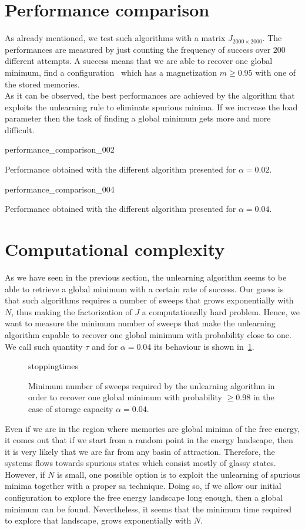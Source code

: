 \documentclass[\rootdir/main.tex]{subfiles}
\begin{document}
\section{Performance comparison}
As already mentioned, we test such algorithms with a matrix $J_{2000 \times 2000}$. The performances are measured by just counting the frequency of success over $200$ different attempts. A success means that we are able to recover one global minimum, \ie find a configuration \bsigma\ which has a magnetization $m \geq 0.95$ with one of the stored memories.\\
As it can be observed, the best performances are achieved by the algorithm that exploits the unlearning rule to eliminate spurious minima. If we increase the load parameter then the task of finding a global minimum gets more and more difficult.
\begin{table}[H]
    \centering
    {performance_comparison_002}
    \caption{Performance obtained with the different algorithm presented for $\alpha = 0.02$.}
    \label{tab:performacnes_002}
\end{table}
\begin{table}[H]
    \centering
    {performance_comparison_004}
    \caption{Performance obtained with the different algorithm presented for $\alpha = 0.04$.}
    \label{tab:performances_004}
\end{table}

\section{Computational complexity}
As we have seen in the previous section, the unlearning algorithm seems to be able to retrieve a global minimum with a certain rate of success. Our guess is that such algorithms requires a number of sweeps that grows exponentially with $N$, thus making the factorization of $J$ a computationally hard problem.
Hence, we want to measure the minimum number of sweeps that make the unlearning algorithm capable to recover one global minimum with probability close to one. We call such quantity $\tau$ and for $\alpha = 0.04$ its behaviour is shown in~\cref{fig:stoppingtimes}.
\begin{figure}[hbt]
    \centering
    {stoppingtimes}
    \caption{Minimum number of sweeps required by the unlearning algorithm in order to recover one global minimum with probability $\geq 0.98$ in the case of storage capacity $\alpha = 0.04$.}
    \label{fig:stoppingtimes}
\end{figure}
Even if we are in the region where memories are global minima of the free energy, it comes out that if we start from a random point in the energy landscape, then it is very likely that we are far from any basin of attraction. Therefore, the systems flows towards spurious states which consist mostly of glassy states. However, if $N$ is small, one possible option is to exploit the unlearning of spurious minima together with a proper \acrlong{sa} technique. Doing so, if we allow our initial configuration to explore the free energy landscape long enough, then a global minimum can be found. Nevertheless, it seems that the minimum time required to explore that landscape, grows exponentially with $N$.
\subbibliography
\end{document}
